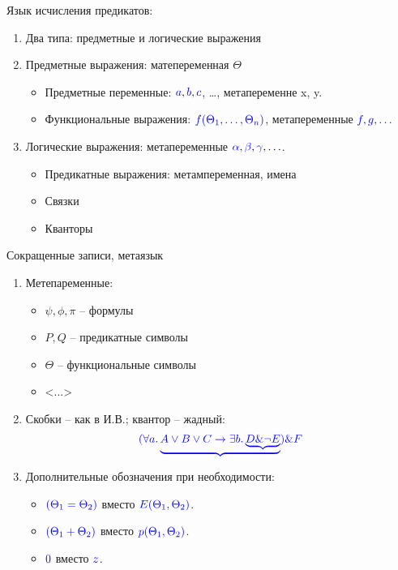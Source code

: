 Язык исчисления предикатов:
\begin{enumerate}
    \item Два типа: предметные и логические выражения
    \item Предметные выражения: матепеременная $\Theta$
    \begin{itemize}
        \item Предметные переменные: ${\color{blue} a}, {\color{blue} b}, {\color{blue} c}$, \ldots, метапеременне {\color{blue} x}, {\color{blue} y}.
        \item Функциональные выражения: ${\color{blue} f(\Theta_1, \ldots, \Theta_n)}$, метапеременные ${\color{blue} f, g, \ldots}$
    \end{itemize}
    \item Логические выражения: метапеременные ${\color{blue}\alpha}, {\color{blue}\beta}, {\color{blue}\gamma}, \ldots$.
    \begin{itemize}
        \item Предикатные выражения: метампеременная, имена
        \item Связки
        \item Кванторы
    \end{itemize}
\end{enumerate}

Сокращенные записи, метаязык
\begin{enumerate}
    \item Метепаременные:
    \begin{itemize}
        \item $\psi, \phi, \pi$ -- формулы
        \item $P, Q$ -- предикатные символы
        \item $\Theta$ -- функциональные символы
        \item <...>
    \end{itemize}

    \item Скобки -- как в И.В.; квантор -- жадный:
     \[ {\color{blue}(\forall a. \underbrace{A \lor B \lor C \to \exists b. \underbrace{D \& \neg E}}) \& F} \]

    \item Дополнительные обозначения при необходимости:
    \begin{itemize}
        \item ${\color{blue} (\Theta_1 = \Theta_2)} $ вместо ${\color{blue} E(\Theta_1, \Theta_2)}$.
        \item ${\color{blue} (\Theta_1 + \Theta_2)} $ вместо ${\color{blue} p(\Theta_1, \Theta_2)}$.
        \item ${\color{blue} 0} $ вместо ${\color{blue} z}$.
    \end{itemize}
\end{enumerate}



